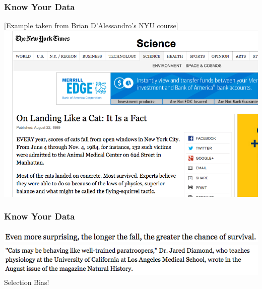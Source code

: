 \documentclass{beamer}
\begin{document}
\begin{frame}
	\frametitle{Know Your Data}
	

		 [Example taken from Brian D'Alessandro's NYU course]\\
	

					

	
		\includegraphics[scale=.34]{figures/nyt_cats.png}\end{frame}




\begin{frame}
	\frametitle{Know Your Data}
	

	
	
	\includegraphics[scale=.5]{figures/nyt_cats_1.png}\\
	
	
		\includegraphics[scale=.5]{figures/nyt_cats_2.png}\\
		\pause
		Selection Bias!
	
	\end{frame}
\end{document}

